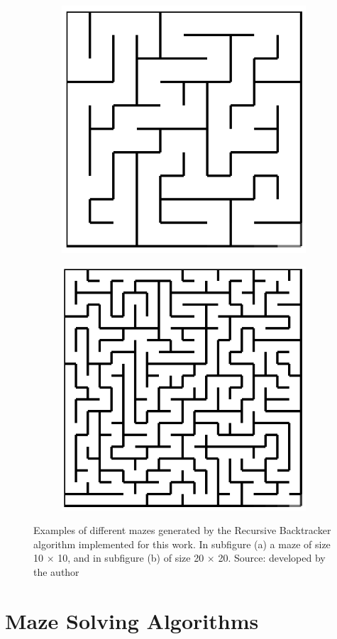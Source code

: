 \begin{figure}[!h]
    \centering
    \begin{subfigure}{.45\textwidth}
    \centering
    \includegraphics[width=.6\linewidth]{recursive1010.png}
    \caption{}
    \label{fig:sub1}
    \end{subfigure}
    \begin{subfigure}{.45\textwidth}
    \centering
    \includegraphics[width=.6\linewidth]{recursive2020.png}
    \caption{}
    \label{fig:sub2}
    \end{subfigure}
    \caption{Examples of different mazes generated by the Recursive Backtracker algorithm implemented for this work. In subfigure (a) a maze of size 10 $\times$ 10, and in subfigure (b) of size 20 $\times$ 20. Source: developed by the author}
    \label{fig:test}
    \end{figure}
\section{Maze Solving Algorithms}
